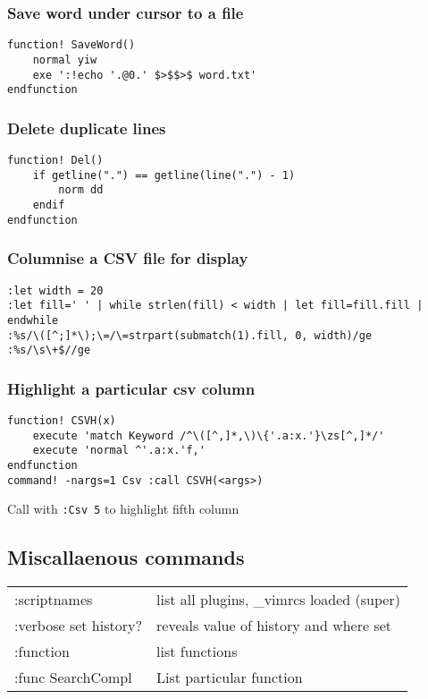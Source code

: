 \subsubsection{Save word under cursor to a file}

\begin{verbatim}
function! SaveWord()
    normal yiw
    exe ':!echo '.@0.' $>$$>$ word.txt'
endfunction
\end{verbatim}

\subsubsection{Delete duplicate lines}

\begin{verbatim}
function! Del()
    if getline(".") == getline(line(".") - 1)
        norm dd
    endif
endfunction
\end{verbatim}

\subsubsection{Columnise a CSV file for display}

\begin{verbatim}
:let width = 20
:let fill=' ' | while strlen(fill) < width | let fill=fill.fill | endwhile
:%s/\([^;]*\);\=/\=strpart(submatch(1).fill, 0, width)/ge
:%s/\s\+$//ge
\end{verbatim}

\subsubsection{Highlight a particular csv column}

\begin{verbatim}
function! CSVH(x)
    execute 'match Keyword /^\([^,]*,\)\{'.a:x.'}\zs[^,]*/'
    execute 'normal ^'.a:x.'f,'
endfunction
command! -nargs=1 Csv :call CSVH(<args>)
\end{verbatim}

Call with \verb!:Csv 5! to highlight fifth column

\subsection{Miscallaenous commands}
\begin{center}
\begin{longtable}{l|l}
 :scriptnames & list all plugins, \_vimrcs loaded (super)\\
 :verbose set history? & reveals value of history and where set\\
 :function & list functions\\
 :func SearchCompl & List particular function
\end{longtable}
\end{center}

